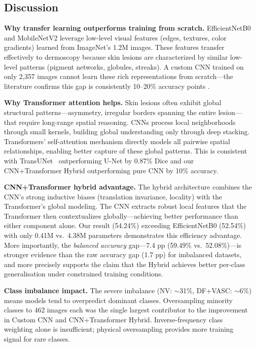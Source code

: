 \documentclass[10pt,twocolumn]{article}
\begin{document}
\subsection{Discussion}

\textbf{Why transfer learning outperforms training from scratch.} EfficientNetB0 and MobileNetV2 leverage low-level visual features (edges, textures, color gradients) learned from ImageNet's 1.2M images. These features transfer effectively to dermoscopy because skin lesions are characterized by similar low-level patterns (pigment networks, globules, streaks). A custom CNN trained on only 2,357 images cannot learn these rich representations from scratch---the literature confirms this gap is consistently 10--20\% accuracy points \cite{Kassem2024, Esteva2017}.

\textbf{Why Transformer attention helps.} Skin lesions often exhibit global structural patterns---asymmetry, irregular borders spanning the entire lesion---that require long-range spatial reasoning. CNNs process local neighborhoods through small kernels, building global understanding only through deep stacking. Transformers' self-attention mechanism directly models all pairwise spatial relationships, enabling better capture of these global patterns. This is consistent with TransUNet~\cite{ChenTransUNet2021} outperforming U-Net by 0.87\% Dice and our CNN+Transformer Hybrid outperforming pure CNN by 10\% accuracy.

\textbf{CNN+Transformer hybrid advantage.} The hybrid architecture combines the CNN's strong inductive biases (translation invariance, locality) with the Transformer's global modeling. The CNN extracts robust local features that the Transformer then contextualizes globally---achieving better performance than either component alone. Our result (54.24\%) exceeding EfficientNetB0 (52.54\%) with only 0.41M vs.\ 4.38M parameters demonstrates this efficiency advantage. More importantly, the \textit{balanced accuracy} gap---7.4 pp (59.49\% vs.\ 52.08\%)---is stronger evidence than the raw accuracy gap (1.7 pp) for imbalanced datasets, and more precisely supports the claim that the Hybrid achieves better per-class generalisation under constrained training conditions.

\textbf{Class imbalance impact.} The severe imbalance (NV: $\sim$31\%, DF+VASC: $\sim$6\%) means models tend to overpredict dominant classes. Oversampling minority classes to 462 images each was the single largest contributor to the improvement in Custom CNN and CNN+Transformer Hybrid. Inverse-frequency class weighting alone is insufficient; physical oversampling provides more training signal for rare classes.
\end{document}
